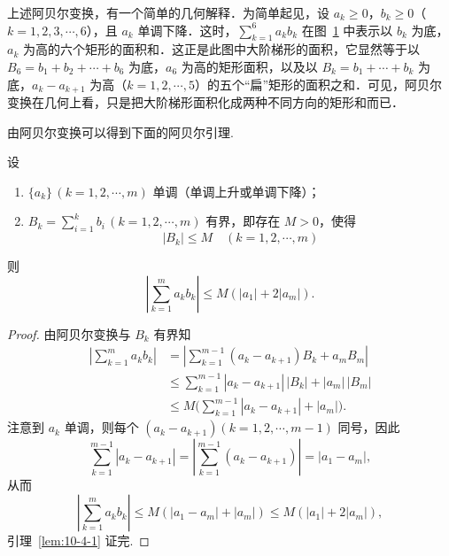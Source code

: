 \begin{figure}[htbp]
\centering
{}
\caption{\relax}
\label{fig:10-2}
\end{figure}

上述阿贝尔变换，有一个简单的几何解释．为简单起见，设 $a_{k}\geqslant0$，$b_{k}\geqslant0$（$k=1,2,3,\cdots,6$），且 $a_{k}$ 单调下降．这时，$\sum_{k=1}^{6}a_{k}b_{k}$ 在图~\ref{fig:10-2} 中表示以 $b_{k}$ 为底，$a_{k}$ 为高的六个矩形的面积和．这正是此图中大阶梯形的面积，它显然等于以 $B_{6}=b_{1}+b_{2}+\cdots+b_{6}$ 为底，$a_{6}$ 为高的矩形面积，以及以 $B_{k}=b_{1}+\cdots+b_{k}$ 为底，$a_{k}-a_{k+1}$ 为高（$k=1,2,\cdots,5$）的五个``扁''矩形的面积之和．可见，阿贝尔变换在几何上看，只是把大阶梯形面积化成两种不同方向的矩形和而已．

由阿贝尔变换可以得到下面的阿贝尔引理.

\begin{lemma}[阿贝尔引理]\label{lem:10-4-1}
设
\begin{enumerate}[label=(\roman*)]
\item $\{a_{k}\}\,(k=1,2,\cdots,m)$ 单调（单调上升或单调下降）；
\item $B_{k}=\sum_{i=1}^{k}b_{i}\,(k=1,2,\cdots,m)$ 有界，即存在 $M>0$，使得
\[
|B_{k}|\leqslant M\quad(k=1,2,\cdots,m)
\]
\end{enumerate}
则
\[
\left|\sum_{k=1}^{m}a_{k}b_{k}\right|\leqslant M\left(|a_{1}|+2|a_{m}|\right).
\]
\end{lemma}

\begin{proof}
由阿贝尔变换与 $B_{k}$ 有界知
\[
\begin{aligned}
\left|\sum_{k=1}^{m}a_{k}b_{k}\right|&=\left|\sum_{k=1}^{m-1}(a_{k}-a_{k+1})B_{k}+a_{m}B_{m}\right|\\
&\leqslant\sum_{k=1}^{m-1}|a_{k}-a_{k+1}|\,|B_{k}|+|a_{m}|\,|B_{m}|\\
&\leqslant M\Big(\sum_{k=1}^{m-1}|a_{k}-a_{k+1}|+|a_{m}|\Big).
\end{aligned}
\]
注意到 $a_{k}$ 单调，则每个 $(a_{k}-a_{k+1})(k=1,2,\cdots,m-1)$ 同号，因此
\[
\sum_{k=1}^{m-1}|a_{k}-a_{k+1}|=\left|\sum_{k=1}^{m-1}(a_{k}-a_{k+1})\right|=|a_{1}-a_{m}|,
\]
从而
\[
\left|\sum_{k=1}^{m}a_{k}b_{k}\right|\leqslant M\left(|a_{1}-a_{m}|+|a_{m}|\right)\leqslant M\left(|a_{1}|+2|a_{m}|\right),
\]
引理~\ref{lem:10-4-1} 证完.
\end{proof}

